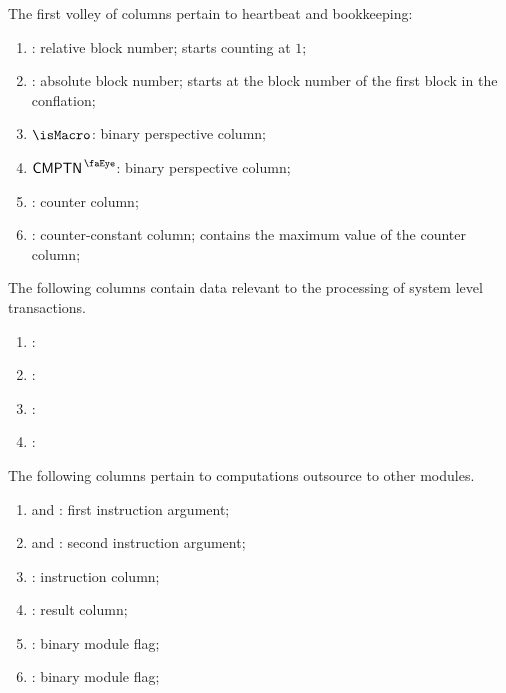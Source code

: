 The first volley of columns pertain to heartbeat and bookkeeping:
\begin{enumerate}
	\item
		\relBlock{}:
		relative block number;
		starts counting at $1$;
	\item
		\absBlock{}:
		absolute block number;
		starts at the block number of the first block in the conflation;
	\item
		$\isMacro$:
		binary perspective column;
	\item
		$\isComputation$:
		binary perspective column;
	\item
		\ct{}:
		counter column;
	\item
		\maxCt{}:
		counter-constant column;
		contains the maximum value of the counter column;
\end{enumerate}
The following columns contain data relevant to the processing of system level transactions.
\begin{enumerate}[resume]
	\item
		\godGiven{}
		\layerOneTimeStamp{}:
	\item
		\godGiven{}
		\beaconRootHi{}:
	\item
		\godGiven{}
		\beaconRootLo{}:
	\item
		\markAsJustifiedHere{}
		\layerOneTimeStampModuloPrime{}:
\end{enumerate}
The following columns pertain to computations outsource to other modules.
\begin{enumerate}[resume]
	\item
		\computationArgOneHi{} and \computationArgOneLo{}:
		first instruction argument;
	\item
		\computationArgTwoHi{} and \computationArgTwoLo{}:
		second instruction argument;
	\item
		\computationInst:
		instruction column;
	\item
		\computationRes:
		result column;
	\item
		\computationWcpFlag:
		binary \wcpMod{} module flag;
	\item
		\computationEucFlag:
		binary \eucMod{} module flag;
\end{enumerate}
